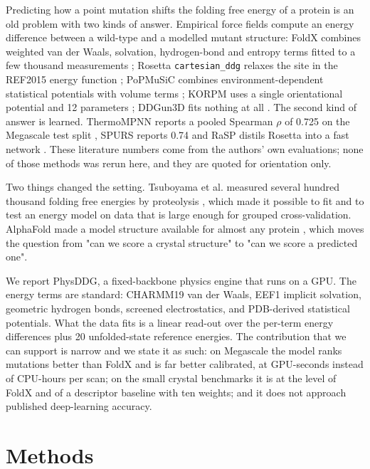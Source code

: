 \documentclass[unnumsec,webpdf,contemporary,large]{oup-authoring-template}
\begin{document}
Predicting how a point mutation shifts the folding free energy of a protein is an old problem with two kinds of
answer. Empirical force fields compute an energy difference between a wild-type and a modelled mutant structure:
FoldX combines weighted van der Waals, solvation, hydrogen-bond and entropy terms fitted to a few thousand
measurements \citep{guerois2002,schymkowitz2005,delgado2019}; Rosetta \texttt{cartesian\_ddg} relaxes the site in
the REF2015 energy function \citep{alford2017,park2016}; PoPMuSiC combines environment-dependent statistical
potentials with volume terms \citep{gilis1997,dehouck2009}; KORPM uses a single orientational potential and 12
parameters \citep{hernandez2023}; DDGun3D fits nothing at all \citep{montanucci2019,montanucci2022}. The second
kind of answer is learned. ThermoMPNN reports a pooled Spearman $\rho$ of 0.725 on the Megascale test split
\citep{dieckhaus2024}, SPURS reports 0.74 \citep{li2026} and RaSP distils Rosetta into a fast network
\citep{blaabjerg2023}. These literature numbers come from the authors' own evaluations; none of those methods
was rerun here, and they are quoted for orientation only.

Two things changed the setting. Tsuboyama et al. measured several hundred thousand folding free energies by
proteolysis \citep{tsuboyama2023}, which made it possible to fit and to test an energy model on data that is
large enough for grouped cross-validation. AlphaFold made a model structure available for almost any protein
\citep{jumper2021,varadi2022}, which moves the question from "can we score a crystal structure" to "can we score
a predicted one".

We report PhysDDG, a fixed-backbone physics engine that runs on a GPU. The energy terms are standard: CHARMM19
van der Waals, EEF1 implicit solvation, geometric hydrogen bonds, screened electrostatics, and PDB-derived
statistical potentials. What the data fits is a linear read-out over the per-term energy differences plus 20
unfolded-state reference energies. The contribution that we can support is narrow and we state it as such: on
Megascale the model ranks mutations better than FoldX and is far better calibrated, at GPU-seconds instead of
CPU-hours per scan; on the small crystal benchmarks it is at the level of FoldX and of a descriptor baseline
with ten weights; and it does not approach published deep-learning accuracy.

\section{Methods}
\end{document}
